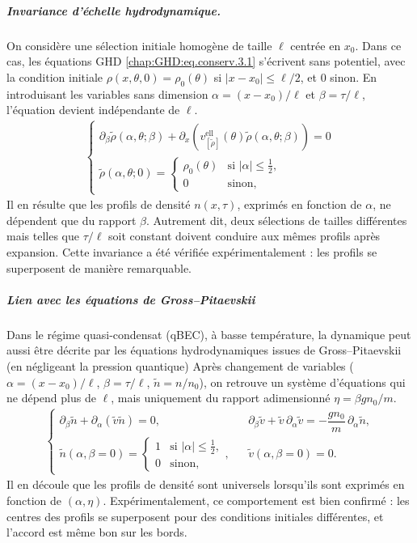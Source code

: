 \subparagraph{Invariance d’échelle hydrodynamique.}
On considère une sélection initiale homogène de taille $\ell$ centrée en $x_0$. Dans ce cas, les équations GHD \eqref{chap:GHD:eq.conserv.3.1} s’écrivent sans potentiel, avec la condition initiale $\rho(x,\theta,0)=\rho_0(\theta)$ si $|x-x_0|\leq \ell/2$, et $0$ sinon. En introduisant les variables sans dimension $\alpha=(x-x_0)/\ell$ et $\beta=\tau/\ell$, l’équation devient indépendante de $\ell$. 
\begin{eqnarray*}
	\left \{ 
	\begin{array}{rcl}
		\partial_\beta \tilde{\rho} ( \alpha , \theta ; \beta ) +  \partial_x ( v^{\mathrm{ell}}_{[\tilde{\rho}]} (\theta)  \tilde{\rho} ( \alpha , \theta ; \beta )) = 0 \\
		\tilde{\rho} ( \alpha , \theta ; 0 )	 = \begin{cases}
			\rho_0(\theta) & \text{si } |\alpha|\leq \tfrac{1}{2}, \\
			0 & \text{sinon},
		\end{cases}%
	\end{array}
	\right .
\end{eqnarray*}
Il en résulte que les profils de densité $n(x,\tau)$, exprimés en fonction de $\alpha$, ne dépendent que du rapport $\beta$. 
Autrement dit, deux sélections de tailles différentes mais telles que $\tau/\ell$ soit constant doivent conduire aux mêmes profils après expansion. Cette invariance a été vérifiée expérimentalement : les profils se superposent de manière remarquable.

\subparagraph{Lien avec les équations de Gross–Pitaevskii}
Dans le régime quasi-condensat (qBEC), à basse température, la dynamique peut aussi être décrite par les équations hydrodynamiques issues de Gross–Pitaevskii (en négligeant la pression quantique) 
Après changement de variables ($\alpha=(x-x_0)/\ell$, $\beta=\tau/\ell$, $\tilde n=n/n_0$), on retrouve un système d’équations qui ne dépend plus de $\ell$, mais uniquement du rapport adimensionné $\eta=\beta g n_0/m$.
\begin{eqnarray*}
	\left \{ 
	\begin{array}{rcl}
		\partial_\beta \tilde n + \partial_\alpha ( \tilde v \tilde n) = 0, && \partial_\beta \tilde v + \tilde v \,\partial_\alpha \tilde v = - \dfrac{g n_0}{m}\,\partial_\alpha \tilde n, \\[6pt]
	\tilde n(\alpha,\beta=0) = 
		\begin{cases}
			1 & \text{si } |\alpha|\leq \tfrac{1}{2}, \\
			0 & \text{sinon},
		\end{cases}, && 
\tilde v(\alpha,\beta=0)=0.
	\end{array}
	\right.
\end{eqnarray*}
Il en découle que les profils de densité sont universels lorsqu’ils sont exprimés en fonction de $(\alpha,\eta)$. Expérimentalement, ce comportement est bien confirmé : les centres des profils se superposent pour des conditions initiales différentes, et l’accord est même bon sur les bords.

